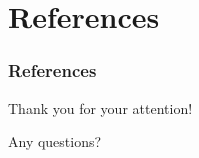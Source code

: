 
\section{References}

\begin{frame}
  \frametitle{References}
  \printbibliography %
\end{frame}



\begin{frame}
    \Large
    \begin{alertblock}{}
        \centering
        Thank you for your attention!

        Any questions?
    \end{alertblock}
\end{frame}

